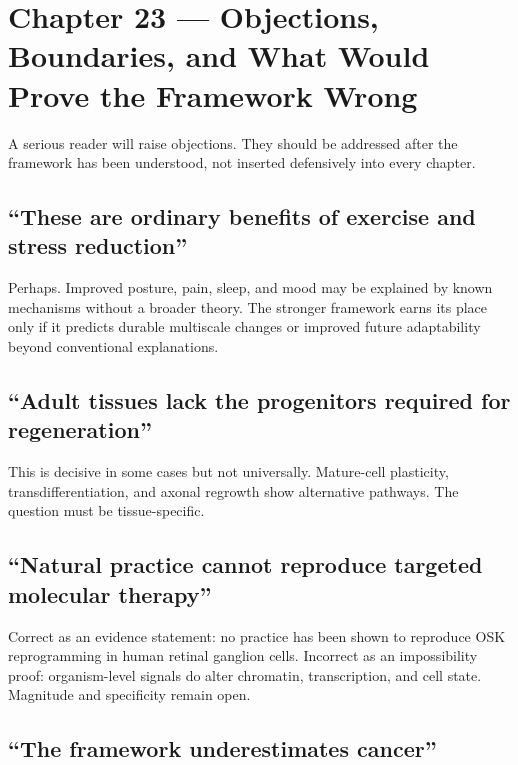 \chapter{Chapter 23 --- Objections, Boundaries, and What Would Prove the Framework Wrong}\label{chapter-23-objections-boundaries-and-what-would-prove-the-framework-wrong}

A serious reader will raise objections. They should be addressed after the framework has been understood, not inserted defensively into every chapter.

\section{``These are ordinary benefits of exercise and stress reduction''}\label{these-are-ordinary-benefits-of-exercise-and-stress-reduction}

Perhaps. Improved posture, pain, sleep, and mood may be explained by known mechanisms without a broader theory. The stronger framework earns its place only if it predicts durable multiscale changes or improved future adaptability beyond conventional explanations.

\section{``Adult tissues lack the progenitors required for regeneration''}\label{adult-tissues-lack-the-progenitors-required-for-regeneration}

This is decisive in some cases but not universally. Mature-cell plasticity, transdifferentiation, and axonal regrowth show alternative pathways. The question must be tissue-specific.

\section{``Natural practice cannot reproduce targeted molecular therapy''}\label{natural-practice-cannot-reproduce-targeted-molecular-therapy}

Correct as an evidence statement: no practice has been shown to reproduce OSK reprogramming in human retinal ganglion cells. Incorrect as an impossibility proof: organism-level signals do alter chromatin, transcription, and cell state. Magnitude and specificity remain open.

\section{``The framework underestimates cancer''}\label{the-framework-underestimates-cancer}

